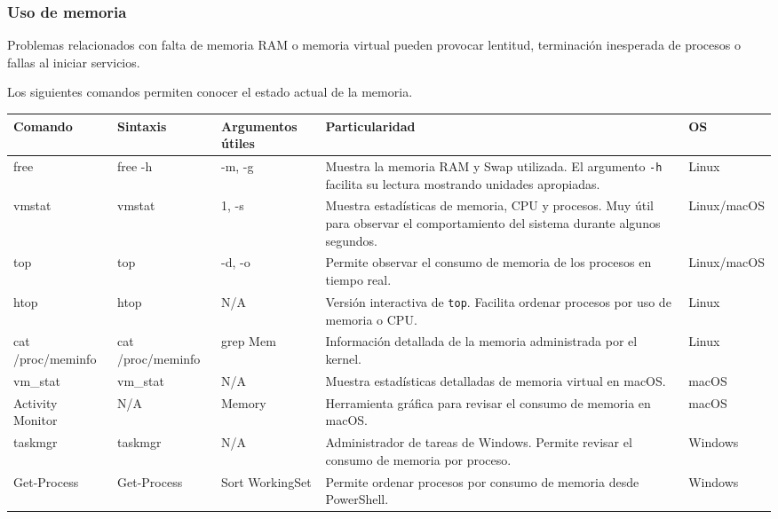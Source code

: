 \documentclass[a4paper,10pt]{article}
\begin{document}

\subsubsection{Uso de memoria}

Problemas relacionados con falta de memoria RAM o memoria virtual pueden provocar
lentitud, terminación inesperada de procesos o fallas al iniciar servicios.

Los siguientes comandos permiten conocer el estado actual de la memoria.

\begin{longtable}{|p{2.8cm}|p{3cm}|p{4cm}|p{5.6cm}|p{1.5cm}|}

\hline
Comando &
Sintaxis &
Argumentos útiles &
Particularidad &
OS
\\
\hline
\endhead

free &
free -h &
-m, -g &
Muestra la memoria RAM y Swap utilizada. El argumento \texttt{-h} facilita su lectura mostrando unidades apropiadas. &
Linux
\\
\hline

vmstat &
vmstat &
1, -s &
Muestra estadísticas de memoria, CPU y procesos. Muy útil para observar el comportamiento del sistema durante algunos segundos. &
Linux/macOS
\\
\hline

top &
top &
-d, -o &
Permite observar el consumo de memoria de los procesos en tiempo real. &
Linux/macOS
\\
\hline

htop &
htop &
N/A &
Versión interactiva de \texttt{top}. Facilita ordenar procesos por uso de memoria o CPU. &
Linux
\\
\hline

cat /proc/meminfo &
cat /proc/meminfo &
grep Mem &
Información detallada de la memoria administrada por el kernel. &
Linux
\\
\hline

vm\_stat &
vm\_stat &
N/A &
Muestra estadísticas detalladas de memoria virtual en macOS. &
macOS
\\
\hline

Activity Monitor &
N/A &
Memory &
Herramienta gráfica para revisar el consumo de memoria en macOS. &
macOS
\\
\hline

taskmgr &
taskmgr &
N/A &
Administrador de tareas de Windows. Permite revisar el consumo de memoria por proceso. &
Windows
\\
\hline

Get-Process &
Get-Process &
Sort WorkingSet &
Permite ordenar procesos por consumo de memoria desde PowerShell. &
Windows
\\
\hline

\end{longtable}
\end{document}
